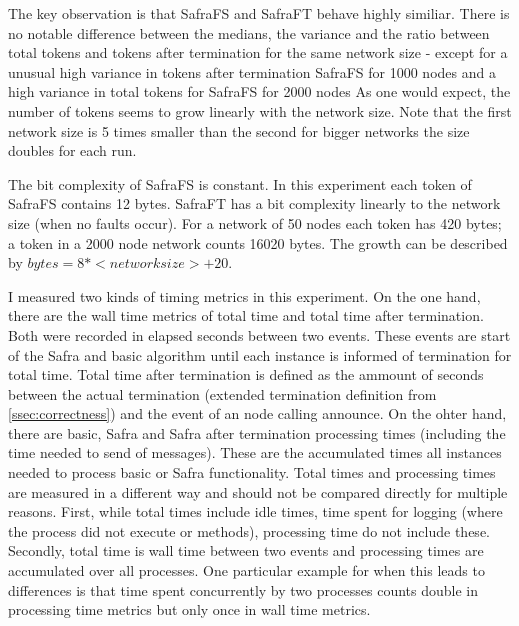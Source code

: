 The key observation is that SafraFS and SafraFT behave highly similiar.
There is no notable difference between the medians, the variance and the ratio between total tokens and tokens after termination for the same network size - except for a unusual high variance in tokens after termination SafraFS for 1000 nodes and a high variance in total tokens for SafraFS for 2000 nodes %
As one would expect, the number of tokens seems to grow linearly with the network size.
Note that the first network size is 5 times smaller than the second for bigger networks the  size doubles for each run.

The bit complexity of SafraFS is constant.
In this experiment each token of SafraFS contains 12 bytes.
SafraFT has a bit complexity linearly to the network size (when no faults occur).
For a network of 50 nodes each token has 420 bytes; a token in a 2000 node network counts 16020 bytes.
The growth can be described by $bytes = 8 * <network size> + 20$.

I measured two kinds of timing metrics in this experiment.
On the one hand, there are the wall time metrics of total time and total time after termination.
Both were recorded in elapsed seconds between two events. 
These events are start of the Safra and basic algorithm until each instance is informed of termination for total time. 
Total time after termination is defined as the ammount of seconds between the actual termination (extended termination definition from \cref{ssec:correctness}) and the event of an node calling
announce. %
On the ohter hand, there are basic, Safra and Safra after termination processing times (including the time needed to send of messages).
These are the accumulated times all instances needed to process basic or Safra functionality.
Total times and processing times are measured in a different way and should not be compared directly for multiple reasons. 
First, while total times include idle times, time spent for logging (where the process did not execute or methods), processing time do not include these.
Secondly, total time is wall time between two events and processing times are accumulated over all processes. 
One particular example for when this leads to differences is that time spent concurrently by two processes counts double in processing time metrics but only once in wall time metrics.

